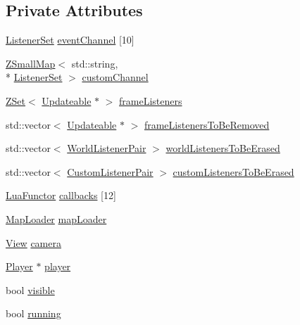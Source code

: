 \subsection*{Private Attributes}
\begin{DoxyCompactItemize}
\item 
\hyperlink{classZeta_1_1WorldManager_aab11e4268a3e5b0d650668134bf73ef0}{Listener\+Set} \hyperlink{classZeta_1_1WorldManager_a0fe0b18ba1b0254d5422fb1b213211e4}{event\+Channel} \mbox{[}10\mbox{]}
\item 
\hyperlink{namespaceZeta_a4c11e23ddc559dccdb5e85901d7dfb84}{Z\+Small\+Map}$<$ std\+::string, \\*
\hyperlink{classZeta_1_1WorldManager_aab11e4268a3e5b0d650668134bf73ef0}{Listener\+Set} $>$ \hyperlink{classZeta_1_1WorldManager_ab268372a957917e58c113083087fb4a5}{custom\+Channel}
\item 
\hyperlink{namespaceZeta_a92c229b4db6ab7275c2b7f32bdfabc87}{Z\+Set}$<$ \hyperlink{classZeta_1_1Updateable}{Updateable} $\ast$ $>$ \hyperlink{classZeta_1_1WorldManager_a9806e16597676563228f8f6c06a85e54}{frame\+Listeners}
\item 
std\+::vector$<$ \hyperlink{classZeta_1_1Updateable}{Updateable} $\ast$ $>$ \hyperlink{classZeta_1_1WorldManager_a3910bb75091f95c5b8e8d04550bc4eae}{frame\+Listeners\+To\+Be\+Removed}
\item 
std\+::vector$<$ \hyperlink{structZeta_1_1WorldManager_1_1WorldListenerPair}{World\+Listener\+Pair} $>$ \hyperlink{classZeta_1_1WorldManager_a9d5daaf5fd9db8f35b52e9606c6d9ede}{world\+Listeners\+To\+Be\+Erased}
\item 
std\+::vector$<$ \hyperlink{structZeta_1_1WorldManager_1_1CustomListenerPair}{Custom\+Listener\+Pair} $>$ \hyperlink{classZeta_1_1WorldManager_a4737df2046668caffa598cf1e2b7e153}{custom\+Listeners\+To\+Be\+Erased}
\item 
\hyperlink{classZeta_1_1LuaFunctor}{Lua\+Functor} \hyperlink{classZeta_1_1WorldManager_ad7cd870adcdb916ad11ebd770e7e17bf}{callbacks} \mbox{[}12\mbox{]}
\item 
\hyperlink{classZeta_1_1MapLoader}{Map\+Loader} \hyperlink{classZeta_1_1WorldManager_aa74c8d0807809445d3dbae2d6ec6281f}{map\+Loader}
\item 
\hyperlink{classZeta_1_1View}{View} \hyperlink{classZeta_1_1WorldManager_a66357a14540415262464a5fc35ae75fd}{camera}
\item 
\hyperlink{classZeta_1_1Player}{Player} $\ast$ \hyperlink{classZeta_1_1WorldManager_abf8ed0d3fbc48096ac16edfdce8c14f7}{player}
\item 
bool \hyperlink{classZeta_1_1WorldManager_a047253e00257f247919a2d075baafc34}{visible}
\item 
bool \hyperlink{classZeta_1_1WorldManager_af613bcf59a48f527ae8ad965ac325bfc}{running}
\end{DoxyCompactItemize}
